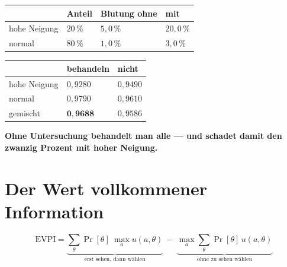 \begin{merksatz}
\begin{center}
{\small
\renewcommand{\arraystretch}{1.5}
\begin{tabular}{@{}P{2.6cm}P{2.0cm}P{2.0cm}P{1.8cm}@{}}
\toprule
& \textbf{Anteil} & \textbf{Blutung ohne} & \textbf{mit}\\
\midrule
hohe Neigung & $20\,\%$ & $5{,}0\,\%$ & $20{,}0\,\%$\\
normal & $80\,\%$ & $1{,}0\,\%$ & $3{,}0\,\%$\\
\bottomrule
\end{tabular}}
\end{center}

\begin{center}
{\small
\renewcommand{\arraystretch}{1.48}
\begin{tabular}{@{}P{2.6cm}P{2.4cm}P{2.4cm}@{}}
\toprule
& \textbf{behandeln} & \textbf{nicht}\\
\midrule
hohe Neigung & $0{,}9280$ & $0{,}9490$\\
normal & $0{,}9790$ & $0{,}9610$\\
\midrule
gemischt & $\mathbf{0{,}9688}$ & $0{,}9586$\\
\bottomrule
\end{tabular}}
\end{center}

\begin{center}
\begin{minipage}{0.9\textwidth}
\textbf{Ohne Untersuchung behandelt man alle --- und schadet damit den zwanzig Prozent mit hoher Neigung.}
\end{minipage}
\end{center}
\end{merksatz}

\section{Der Wert vollkommener Information}

\begin{definition}
\[ \text{EVPI} = \underbrace{\sum_\theta \Pr[\theta]\ \max_a u(a,\theta)}_{\text{erst sehen, dann wählen}} \ - \ \underbrace{\max_a \sum_\theta \Pr[\theta]\,u(a,\theta)}_{\text{ohne zu sehen wählen}} \]
\end{definition}

